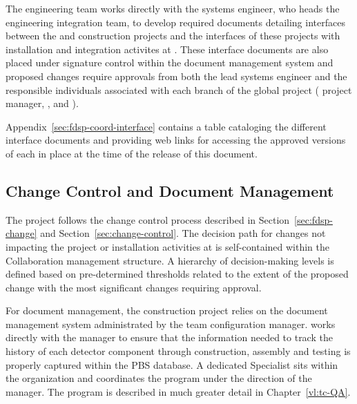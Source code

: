 The  engineering team works directly with the
 systems engineer, who heads the  
engineering integration team, to develop required documents 
detailing interfaces between the  and  
 construction projects and the interfaces of these 
projects with  installation and integration
activites at .  These  interface 
documents are also placed under signature control within the 
 document management system and proposed 
changes require approvals from both the lead  
systems engineer and the responsible individuals associated 
with each branch of the global project ( project 
manager,  , and ).

Appendix~\ref{sec:fdsp-coord-interface} contains a table 
cataloging the different  interface documents 
and providing web links for accessing the approved versions 
of each in place at the time of the release of this document.
 
\subsection{Change Control and Document Management}
\label{sec:tc_change control}

The  project follows the  change control
process described in Section~\ref{sec:fdsp-change} and
Section~\ref{sec:change-control}.  The decision path for changes not
impacting the  project or  
installation activities at  is self-contained within
the  Collaboration management structure.  A hierarchy of
decision-making levels is defined based on pre-determined thresholds
related to the extent of the proposed change with the most significant
changes requiring   approval.

For document management, the  construction project 
relies on the  document management system 
administrated by the  team configuration manager.  
 works directly with the   
manager to ensure that the information needed to track the 
history of each detector component through construction, 
assembly and testing is properly captured within the PBS 
database.  A dedicated   Specialist 
sits within the  organization and coordinates the 
  program under the direction of the
  manager.  The  
 program is described in much greater detail in 
Chapter~\ref{vl:tc-QA}.
 
